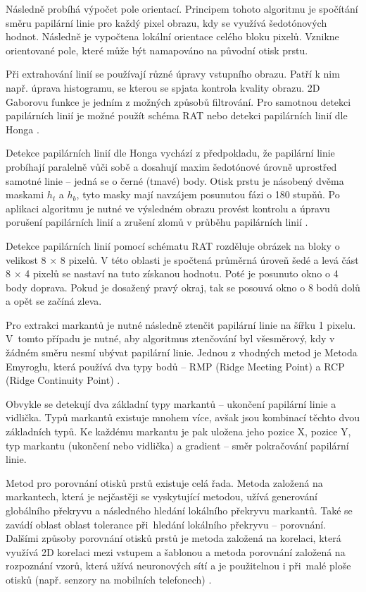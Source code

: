 Následně probíhá výpočet pole orientací. Principem tohoto algoritmu je spočítání směru papilární linie pro každý pixel obrazu, kdy se využívá šedotónových hodnot. Následně je vypočtena lokální orientace celého bloku pixelů. Vznikne orientované pole, které může být namapováno na původní otisk prstu.

Při extrahování linií se používají různé úpravy vstupního obrazu. Patří k nim např. úprava histogramu, se kterou se spjata kontrola kvality obrazu. 2D Gaborovu funkce je jedním z možných způsobů filtrování. Pro samotnou detekci papilárních linií je možné použít schéma RAT nebo detekci papilárních linií dle Honga \cite{BIOopora}. 

Detekce papilárních linií dle Honga vychází z předpokladu, že papilární linie probíhají paralelně vůči sobě a dosahují maxim šedotónové úrovně uprostřed samotné linie -- jedná se o černé (tmavé) body. Otisk prstu je násobený dvěma maskami $h_t$ a $h_b$, tyto masky mají navzájem posunutou fázi o 180 stupňů. Po aplikaci algoritmu je nutné ve výsledném obrazu provést kontrolu a úpravu porušení papilárních linií a zrušení zlomů v průběhu papilárních linií \cite{BIOotiskyLecture}.

Detekce papilárních linií pomocí schématu RAT rozděluje obrázek na bloky o velikost 8 $\times$ 8 pixelů. V této oblasti je spočtená průměrná úroveň šedé a levá část 8 $\times$ 4 pixelů se nastaví na tuto získanou hodnotu. Poté je posunuto okno o 4 body doprava. Pokud je dosažený pravý okraj, tak se posouvá okno o 8 bodů dolů a opět se začíná zleva.

Pro extrakci markantů je nutné následně ztenčit papilární linie na šířku 1 pixelu. V~tomto případu je nutné, aby algoritmus ztenčování byl všesměrový, kdy v žádném směru nesmí ubývat papilární linie. Jednou z vhodných metod je Metoda Emyroglu, která používá dva typy bodů -- RMP (Ridge Meeting Point) a RCP (Ridge Continuity Point) \cite{BIOopora}.

Obvykle se detekují dva základní typy markantů -- ukončení papilární linie a vidlička. Typů markantů existuje mnohem více, avšak jsou kombinací těchto dvou základních typů. Ke každému markantu je pak uložena jeho pozice X, pozice Y, typ markantu (ukončení nebo vidlička) a gradient -- směr pokračování papilární linie.

Metod pro porovnání otisků prstů existuje celá řada. Metoda založená na markantech, která je nejčastěji se vyskytující metodou, užívá generování globálního překryvu a následného hledání lokálního překryvu markantů. Také se zavádí oblast oblast tolerance při~hledání lokálního překryvu -- porovnání. Dalšími způsoby porovnání otisků prstů je metoda založená na korelaci, která využívá 2D korelaci mezi vstupem a šablonou a metoda porovnání založená na rozpoznání vzorů, která užívá neuronových sítí a je použitelnou i při~malé ploše otisků (např. senzory na mobilních telefonech) \cite{BIOotiskyLecture}.

